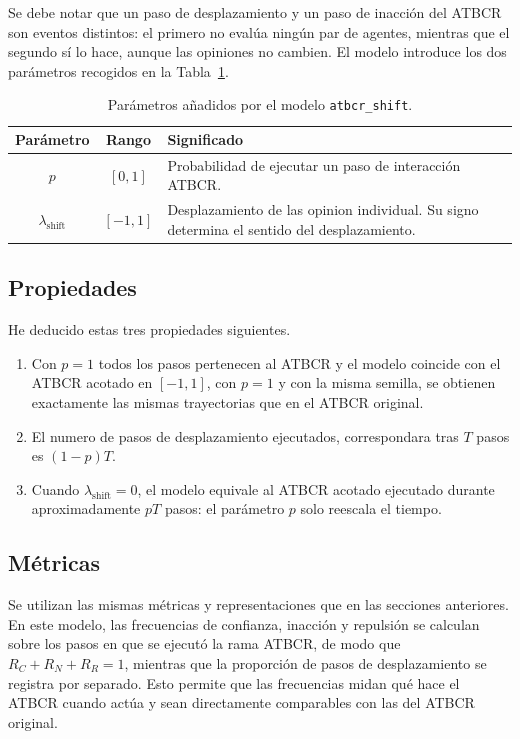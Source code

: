 \documentclass[11pt,a4paper]{article}
\begin{document}
Se debe notar que un paso de desplazamiento y un paso de inacción del ATBCR son eventos distintos: el primero no evalúa ningún par de agentes, mientras que el segundo sí lo hace, aunque las opiniones no cambien. El modelo introduce los dos parámetros recogidos en la Tabla~\ref{tab:shift-parametros}.

\begin{table}[htbp]
\centering
\caption{Parámetros añadidos por el modelo \texttt{atbcr\_shift}.}
\label{tab:shift-parametros}
\begin{tabular}{ccp{8.5cm}}
\toprule
Parámetro & Rango & Significado \\
\midrule
$p$ & $[0,1]$ & Probabilidad de ejecutar un paso de interacción ATBCR. \\
$\lambda_{\mathrm{shift}}$ & $[-1,1]$ & Desplazamiento de las opinion individual. Su signo determina el sentido del desplazamiento. \\
\bottomrule
\end{tabular}
\end{table}

\subsection{Propiedades}
\label{sec:shift-propiedades}

He deducido estas tres propiedades siguientes.

\begin{enumerate}
    \item Con $p=1$ todos los pasos pertenecen al ATBCR y el modelo coincide con el ATBCR acotado en $[-1,1]$, con $p=1$ y con la misma semilla, se obtienen exactamente las mismas trayectorias que en el ATBCR original.
    \item El numero de pasos de desplazamiento ejecutados, correspondara tras $T$ pasos es $(1-p)T$.
    \item Cuando $\lambda_{\mathrm{shift}}=0$, el modelo equivale al ATBCR acotado ejecutado durante aproximadamente $pT$ pasos: el parámetro $p$ solo reescala el tiempo.
\end{enumerate}

\subsection{Métricas}
\label{sec:shift-metricas}

Se utilizan las mismas métricas y representaciones que en las secciones anteriores. En este modelo, las frecuencias de confianza, inacción y repulsión se calculan sobre los pasos en que se ejecutó la rama ATBCR, de modo que $R_C+R_N+R_R=1$, mientras que la proporción de pasos de desplazamiento se registra por separado. Esto permite que las frecuencias midan qué hace el ATBCR cuando actúa y sean directamente comparables con las del ATBCR original.
\end{document}
